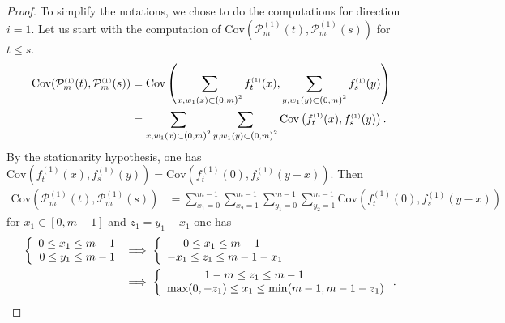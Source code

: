 \documentclass[12pt]{article}
\theoremstyle{Theorem}
\begin{document}
\begin{proof}
To simplify the notations, we chose to do the computations for direction $i =1$. Let us start with the computation of $\text{Cov}(\mathcal{P}_{m}^{\scriptscriptstyle (1)}(t), \mathcal{P}_{m}^{\scriptscriptstyle (1)}(s))$ for $t \leq s$. 
\begin{align*}
\text{Cov}(\mathcal{P}_{m}^{\scriptscriptstyle (1)}(t), \mathcal{P}_{m}^{\scriptscriptstyle (1)}(s))& = \text{Cov}\left( \sum_{x, w_{1}(x) \subset \text{\larger[1]{$($}}0, m \text{\larger[1]{$)$}}^{2}}f_{t}^{\scriptscriptstyle (1)}(x), \sum_{y, w_{1}(y) \subset \text{\larger[1]{$($}}0, m \text{\larger[1]{$)$}}^{2}} f_{s}^{\scriptscriptstyle (1)}(y)\right) \\
& = \sum_{x, w_{1}(x) \subset \text{\larger[1]{$($}}0, m \text{\larger[1]{$)$}}^{2}} \sum_{y, w_{1}(y) \subset \text{\larger[1]{$($}}0, m \text{\larger[1]{$)$}}^{2}} \text{Cov}\left(f_{t}^{\scriptscriptstyle (1)}(x), f_{s}^{\scriptscriptstyle (1)}(y) \right).
\end{align*}
By the stationarity hypothesis, one has $\text{Cov}\left(f_{t}^{\scriptscriptstyle (1)}(x), f_{s}^{\scriptscriptstyle (1)}(y) \right)= \text{Cov}\left(f_{t}^{\scriptscriptstyle (1)}(0), f_{s}^{\scriptscriptstyle (1)}(y-x) \right)$. Then 
\begin{align*}
\text{Cov}\left(\mathcal{P}_{m}^{\scriptscriptstyle (1)}(t),\mathcal{P}_{m}^{\scriptscriptstyle (1)}(s) \right) & = \sum_{x_1 = 0}^{m-1}\sum_{x_2 = 1}^{m-1}\sum_{y_1 = 0}^{m-1}\sum_{y_2 = 1}^{m-1} \text{Cov}\left(f_{t}^{\scriptscriptstyle (1)}(0), f_{s}^{ \scriptscriptstyle (1)}(y-x) \right)
\end{align*}
for $x_1 \in [0,m-1]$ and $z_1 = y_1 - x_1$ one has
\begin{align*} 
\left\{
\begin{array}{rcl}
0 \leq x_1 \leq m-1 \\
0 \leq y_1 \leq m-1 
\end{array}\right.& \implies  \left\{ \begin{array}{rcl}
0 \leq x_1 \leq m-1 \hspace{0.7cm} \\
-x_1 \leq z_1 \leq m-1 - x_1
\end{array}\right. \\
& \implies  \left\{
\begin{array}{rcl}
1-m \leq z_1 \leq m-1 \hspace{2.5cm}  \\
\max(0, -z_1) \leq x_1 \leq \min(m-1 , m-1-z_1)
\end{array}\right..

\end{align*}
\end{proof}
\end{document}
